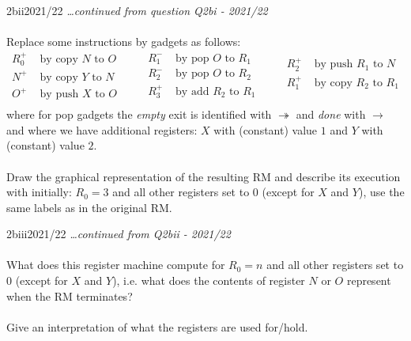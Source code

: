 \begin{exambox}{2bii}{2021/22}
	\textit{\dots continued from question Q2bi - 2021/22}
	\\
	\\ Replace some instructions by gadgets as follows:
	\[\begin{split}
		R_0^+ & \text{ by copy } N \text{ to } O \\
		N^+   & \text{ by copy } Y \text{ to } N \\
		O^+   & \text{ by push } X \text{ to } O \\
	\end{split} \qquad \begin{split}
		R_1^- & \text{ by pop }  O \text{ to } R_1 \\
		R_2^- & \text{ by pop }  O \text{ to } R_2 \\
		R_3^+ & \text{ by add }R_2 \text{ to } R_1 \\
	\end{split} \qquad \begin{split}
		R_2^+ & \text{ by push }R_1 \text{ to } N \\
		R_1^+ & \text{ by copy } R_2 \text{ to } R_1 \\
		\\
	\end{split}\]
	where for pop gadgets the \textit{empty} exit is identified with $\twoheadrightarrow$  and \textit{done}
	with $\to$ and where we have additional registers: $X$ with (constant) value $1$
	and $Y$ with (constant) value $2$.
	\\
	\\ Draw the graphical representation of the resulting RM and describe its
	execution with initially: $R_0 = 3$ and all other registers set to $0$ (except for
	$X$ and $Y$), use the same labels as in the original RM.
\end{exambox}

\begin{exambox}{2biii}{2021/22}
	\textit{\dots continued from Q2bii - 2021/22}
	\\
	\\ What does this register machine compute for $R_0 = n$ and all other registers
	set to $0$ (except for $X$ and $Y$), i.e. what does the contents of register $N$ or $O$
	represent when the RM terminates? 
	\\
	\\Give an interpretation of what the registers are used for/hold.
\end{exambox}

